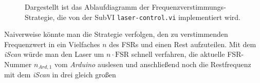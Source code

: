 \begin{figure}[hp]
 	\centering
	\caption[Frequenzverstimmungs-Strategie
	-
	Ablaufdiagramm]{Dargestellt ist das
	Ablaufdiagramm der 
	Frequenzverstimmungs-Strategie,
	die von der SubVI
	\lstinline|laser-control.vi|
	implementiert wird.}\label{fig:frequenzverstimmungs-strategie_ablaufdiagramm}
\end{figure}
Naiverweise könnte man die Strategie verfolgen, den zu verstimmenden
Frequenzwert in ein Vielfaches $n$ des FSRs und einen Rest aufzuteilen. Mit dem
\textit{iScan} würde man den Laser um $n\cdot\text{FSR}$ schnell verfahren,
die aktuelle FSR-Nummer $n_{Ard,1}$ vom \textit{Arduino} auslesen und anschließend
noch die Restfrequenz mit dem \textit{iScan} in drei gleich großen
